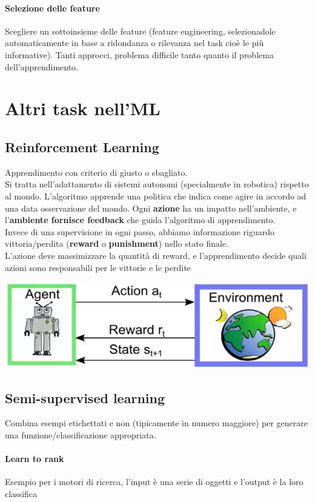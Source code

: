 \documentclass[10pt]{book}
\begin{document}
\paragraph{Selezione delle feature} Scegliere un sottoinsieme delle feature (feature engineering, selezionadole automaticamente in base a ridondanza o rilevanza nel task cioè le più informative). Tanti approcci, problema difficile tanto quanto il problema dell'apprendimento.
\section{Altri task nell'ML}
\subsection{Reinforcement Learning} Apprendimento con criterio di giusto o sbagliato.\\
Si tratta nell'adattamento di sistemi autonomi (specialmente in robotica) rispetto al mondo. L'algoritmo apprende una politica che indica come agire in accordo ad una data osservazione del mondo. Ogni \textbf{azione} ha un impatto nell'ambiente, e l'\textbf{ambiente fornisce feedback} che guida l'algoritmo di apprendimento.\\
Invece di una supervisione in ogni passo, abbiamo informazione riguardo vittoria/perdita (\textbf{reward} o \textbf{punishment}) nello stato finale.\\
L'azione deve massimizzare la quantità di reward, e l'apprendimento decide quali azioni sono responsabili per le vittorie e le perdite
\begin{center}
	\includegraphics[scale=0.75]{mlreinfor.png}
\end{center}
\subsection{Semi-supervised learning} Combina esempi etichettati e non (tipicamente in numero maggiore) per generare una funzione/classificazione appropriata.\\
\paragraph{Learn to rank} Esempio per i motori di ricerca, l'input è una serie di oggetti e l'output è la loro classifica
\end{document}
